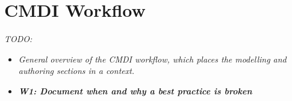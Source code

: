 \chapter{CMDI Workflow}\label{cmdi-workflow}

\emph{TODO:}

\begin{itemize}
\tightlist
\item
  \emph{General overview of the CMDI workflow, which places the
  modelling and authoring sections in a context.}
\item
  \emph{\textbf{W1: Document when and why a best practice is
  broken} }
\end{itemize}
